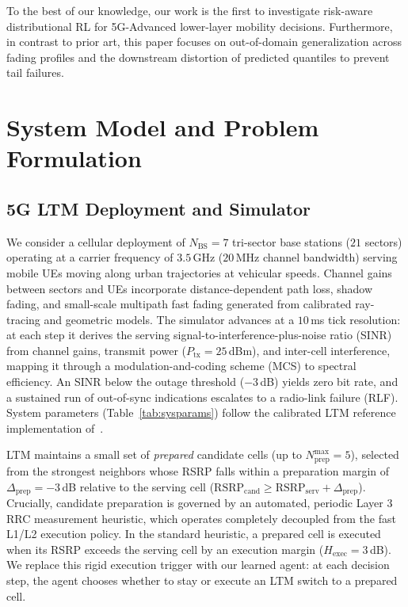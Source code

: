 \documentclass{ieeetmlcn}
\begin{document}
To the best of our knowledge, our work is the first to investigate risk-aware distributional RL for 5G-Advanced lower-layer mobility decisions. Furthermore, in contrast to prior art, this paper focuses on out-of-domain generalization across fading profiles and the downstream distortion of predicted quantiles to prevent tail failures.

\section{System Model and Problem Formulation}
\label{sec:model}

\subsection{5G LTM Deployment and Simulator}
We consider a cellular deployment of $N_{\text{BS}} = 7$ tri-sector base stations ($21$ sectors) operating at a carrier frequency of $3.5$\,GHz ($20$\,MHz channel bandwidth) serving mobile UEs moving along urban trajectories at vehicular speeds. Channel gains between sectors and UEs incorporate distance-dependent path loss, shadow fading, and small-scale multipath fast fading generated from calibrated ray-tracing and geometric models. The simulator advances at a $10$\,ms tick resolution: at each step it derives the serving signal-to-interference-plus-noise ratio (SINR) from channel gains, transmit power ($P_{\text{tx}} = 25$\,dBm), and inter-cell interference, mapping it through a modulation-and-coding scheme (MCS) to spectral efficiency. An SINR below the outage threshold ($-3$\,dB) yields zero bit rate, and a sustained run of out-of-sync indications escalates to a radio-link failure (RLF). System parameters (Table~\ref{tab:sysparams}) follow the calibrated LTM reference implementation of~\cite{cmab_ho}.

LTM maintains a small set of \emph{prepared} candidate cells (up to $N_{\text{prep}}^{\max} = 5$), selected from the strongest neighbors whose RSRP falls within a preparation margin of $\Delta_{\text{prep}} = -3$\,dB relative to the serving cell ($\text{RSRP}_{\text{cand}} \ge \text{RSRP}_{\text{serv}} + \Delta_{\text{prep}}$). Crucially, candidate preparation is governed by an automated, periodic Layer 3 RRC measurement heuristic, which operates completely decoupled from the fast L1/L2 execution policy. In the standard heuristic, a prepared cell is executed when its RSRP exceeds the serving cell by an execution margin ($H_{\text{exec}} = 3$\,dB). We replace this rigid execution trigger with our learned agent: at each decision step, the agent chooses whether to stay or execute an LTM switch to a prepared cell.
\end{document}
